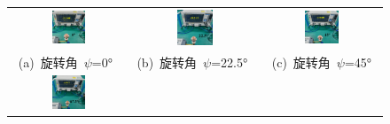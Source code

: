 \documentclass[master]{thesis-uestc}
\begin{document}
\begin{figure}[!htb]
    \small
    \centering
    \begin{tabular}{@{\ }c@{\ }c@{\ }c}
        \includegraphics[width=0.3\textwidth]{pic/chapter5/测试旋转照片/0度.png} & 
        \hspace{5pt}
        \includegraphics[width=0.3\textwidth]{pic/chapter5/测试旋转照片/22.5度.png}   &
        \hspace{5pt}
        \includegraphics[width=0.3\textwidth]{pic/chapter5/测试旋转照片/45度.png}       \\
        \mbox{\small (a) 旋转角 \(\psi\)=0° }                                                                               & 
        \mbox{\small (b) 旋转角 \(\psi\)=22.5° }    & 
        \mbox{\small (c) 旋转角 \(\psi\)=45°}\\[6bp]
        \includegraphics[width=0.3\textwidth]{pic/chapter5/测试旋转照片/67.5度.png} & 

\end{tabular}
\end{figure}
\end{document}
